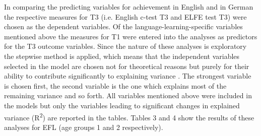 \documentclass[output=paper]{langsci/langscibook}
\begin{document}
In comparing the predicting variables for achievement in English and in German the respective measures for T3 (i.e. English c-test T3 and ELFE test T3) were chosen as the dependent variables. Of the language-learning-specific variables mentioned above the measures for T1 were entered into the analyses as predictors for the T3 outcome variables. Since the nature of these analyses is exploratory the stepwise method is applied, which means that the independent variables selected in the model are chosen not for theoretical reasons but purely for their ability to contribute significantly to explaining variance \citep[213]{Field2009}. The strongest variable is chosen first, the second variable is the one which explains most of the remaining variance and so forth. All variables mentioned above were included in the models but only the variables leading to significant changes in explained variance (R\textsuperscript{2})\textsuperscript{} are reported in the tables. Tables 3 and 4 show the results of these analyses for EFL (age groups 1 and 2 respectively).

\begin{table}
\caption{Grade 5 – results of the stepwise multiple regression analysis for achievement in English (c-test T3) with predictors T1, ***: $p<0.001$, **: $p<0.01$, *: $p<0.05$; $n=170$. SCE: Self-concept English, IA: Inductive ability, FI: Fluid intelligence, BDS: Backward digit span, PCA: Phonemic coding ability}
\end{table}
\end{document}

